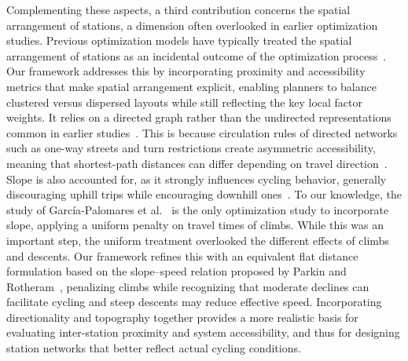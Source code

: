 Complementing these aspects, a third contribution concerns the spatial arrangement of stations, a dimension often overlooked in earlier optimization studies. Previous optimization models have typically treated the spatial arrangement of stations as an incidental outcome of the optimization process~\cite{Frade2015, Cintrano2018, Mete2018, Lin2011}. Our framework addresses this by incorporating proximity and accessibility metrics that make spatial arrangement explicit, enabling planners to balance clustered versus dispersed layouts while still reflecting the key local factor weights. It relies on a directed graph rather than the undirected representations common in earlier studies~\cite{Cintrano2018, Xin2013}. This is because circulation rules of directed networks such as one-way streets and turn restrictions create asymmetric accessibility, meaning that shortest-path distances can differ depending on travel direction~\cite{Melo2022}. Slope is also accounted for, as it strongly influences cycling behavior, generally discouraging uphill trips while encouraging downhill ones~\cite{MateoBabiano2016, Grau-Escolano2024}. To our knowledge, the study of García-Palomares et al.~\cite{GarciaPalomares2012} is the only optimization study to incorporate slope, applying a uniform penalty on travel times of climbs. While this was an important step, the uniform treatment overlooked the different effects of climbs and descents. Our framework refines this with an equivalent flat distance formulation based on the slope–speed relation proposed by Parkin and Rotheram~\cite{Parkin2010}, penalizing climbs while recognizing that moderate declines can facilitate cycling and steep descents may reduce effective speed. Incorporating directionality and topography together provides a more realistic basis for evaluating inter-station proximity and system accessibility, and thus for designing station networks that better reflect actual cycling conditions.

